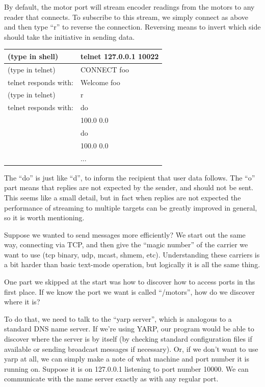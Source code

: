 By default, the motor port will stream encoder readings from the motors
to any reader that connects.  To subscribe to this stream, we simply
connect as above and then type ``r'' to reverse the connection.
Reversing means to invert which side should take the initiative
in sending data.


\begin{tabular}{|l|l|}
\hline
(type in shell) & telnet 127.0.0.1 10022 \\
\hline
(type in telnet) & CONNECT foo \\
\hline
telnet responds with: & Welcome foo \\
\hline
(type in telnet) & r \\
\hline
telnet responds with: & do \\
\hline
 & 100.0 0.0 \\
\hline
 & do \\
\hline
 & 100.0 0.0 \\
\hline
 & ... \\
\hline
\end{tabular}

The ``do'' is just like ``d'', to inform the recipient that user data
follows.  The ``o'' part means that replies are not expected by the
sender, and should not be sent.  This seems like a small detail,
but in fact when replies are not expected the performance of 
streaming to multiple targets can be greatly improved in general,
so it is worth mentioning.

Suppose we wanted to send messages more efficiently?  We start out the
same way, connecting via TCP, and then give the ``magic number'' of
the carrier we want to use (tcp binary, udp, mcast, shmem, etc).
Understanding these carriers is a bit harder than basic text-mode operation,
but logically it is all the same thing.

One part we skipped at the start was how to discover how to 
access ports in ths first place.  If we know the port we want
is called ``/motors'', how do we discover where it is?

To do that, we need to talk to the ``yarp server'', which is analogous
to a standard DNS name server.  If we're using YARP, our program would
be able to discover where the server is by itself (by checking
standard configuration files if available or sending broadcast
messages if necessary).  Or, if we don't want to use yarp at all, we
can simply make a note of what machine and port number it is running
on.  Suppose it is on 127.0.0.1 listening to port number 10000.
We can communicate with the name server exactly as with any regular
port.

